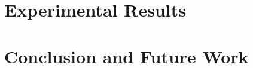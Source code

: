 \documentclass[conference]{IEEEtran}
\begin{document}
\section{Experimental Results}

\section{Conclusion and Future Work}

% 
% 
% 
\end{document}
